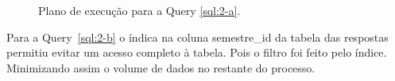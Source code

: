 \documentclass[a4paper,12pt]{article}
\begin{document}
\begin{figure}[hpt]
   \begin{center}
      \\
      \\
   \end{center}
   \caption{Plano de execução para a Query \ref{sql:2-a}.}
   \label{fig:plano_2-a}
\end{figure}

Para a Query~\ref{sql:2-b} o índica na coluna semestre\_id da tabela das respostas
permitiu evitar um acesso completo à tabela. Pois o filtro foi feito
pelo índice. Minimizando assim o volume de dados no restante do processo.

\begin{program}
   
   \caption{Pergunta sobre agregação 2.b.}
   \label{sql:2-b}
\end{program}
\end{document}
